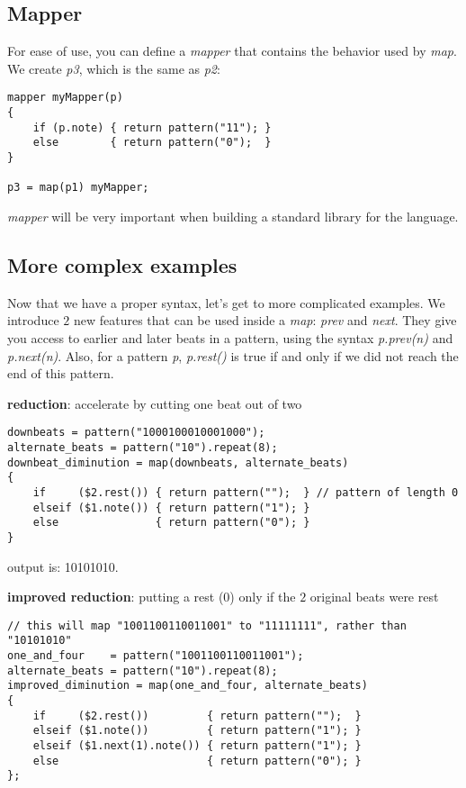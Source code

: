\subsection{Mapper}
For ease of use, you can define a \textit{mapper} that contains the behavior
used by \textit{map}. We create \textit{p3}, which is the same as
\textit{p2}:
\begin{verbatim}
mapper myMapper(p)
{
    if (p.note) { return pattern("11"); }
    else        { return pattern("0");  }
}

p3 = map(p1) myMapper;
\end{verbatim}
\textit{mapper} will be very important when building a standard library
for the language.

\subsection{More complex examples}
Now that we have a proper syntax, let's get to more complicated examples.
We introduce $2$ new features that can be used inside a \textit{map}:
\textit{prev} and \textit{next}. They give you access to earlier
and later beats in a pattern, using the syntax \textit{p.prev(n)} and
\textit{p.next(n)}.
Also, for a pattern \textit{p}, \textit{p.rest()} is
true if and only if we did not reach the end of this pattern.

\textbf{reduction}: accelerate by cutting one beat out of two
\begin{verbatim}
downbeats = pattern("1000100010001000");
alternate_beats = pattern("10").repeat(8);
downbeat_diminution = map(downbeats, alternate_beats)
{
    if     ($2.rest()) { return pattern("");  } // pattern of length 0
    elseif ($1.note()) { return pattern("1"); }
    else               { return pattern("0"); }
}
\end{verbatim}
output is: 10101010.

\textbf{improved reduction}: putting a rest (0) only if the $2$ original beats were rest
\begin{verbatim}
// this will map "1001100110011001" to "11111111", rather than "10101010"
one_and_four    = pattern("1001100110011001");
alternate_beats = pattern("10").repeat(8);
improved_diminution = map(one_and_four, alternate_beats)
{
    if     ($2.rest())         { return pattern("");  }
    elseif ($1.note())         { return pattern("1"); }
    elseif ($1.next(1).note()) { return pattern("1"); }
    else                       { return pattern("0"); }
};
\end{verbatim}


